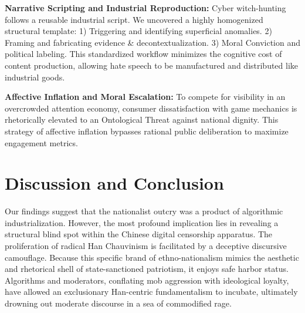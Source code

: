 \documentclass[letterpaper]{article}
\begin{document}
\textbf{Narrative Scripting and Industrial Reproduction:} Cyber witch-hunting follows a reusable industrial script. We uncovered a highly homogenized structural template: 1) Triggering and identifying superficial anomalies. 2) Framing and fabricating evidence \& decontextualization. 3) Moral Conviction and political labeling. This standardized workflow minimizes the cognitive cost of content production, allowing hate speech to be manufactured and distributed like industrial goods.

\textbf{Affective Inflation and Moral Escalation:} To compete for visibility in an overcrowded attention economy, consumer dissatisfaction with game mechanics is rhetorically elevated to an Ontological Threat against national dignity. This strategy of affective inflation bypasses rational public deliberation to maximize engagement metrics.

\section{Discussion and Conclusion}

Our findings suggest that the nationalist outcry was a product of algorithmic industrialization. However, the most profound implication lies in revealing a structural blind spot within the Chinese digital censorship apparatus. The proliferation of radical Han Chauvinism is facilitated by a deceptive discursive camouflage. Because this specific brand of ethno-nationalism mimics the aesthetic and rhetorical shell of state-sanctioned patriotism, it enjoys safe harbor status. Algorithms and moderators, conflating mob aggression with ideological loyalty, have allowed an exclusionary Han-centric fundamentalism to incubate, ultimately drowning out moderate discourse in a sea of commodified rage.


\end{document}
